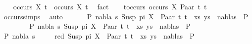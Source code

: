 \begin{isabellebody}
\ \ \isamarkupfalse%
\ {\isachardoublequoteopen}occurs\ X\ t{}\ {\isasymor}\ occurs\ X\ t{}{\isachardoublequoteclose}\ \isamarkupfalse%
\ fact\isanewline
\ \ \isamarkupfalse%
\ t{\isacharunderscore}{\kern0pt}occurs{\isacharcolon}{\kern0pt}\ {\isachardoublequoteopen}occurs\ X\ {\isacharparenleft}{\kern0pt}Paar\ t{}\ t{}{\isacharparenright}{\kern0pt}{\isachardoublequoteclose}\isanewline
\ \ \ \ \isamarkupfalse%
\ occurs{\isachardot}{\kern0pt}simps{\isacharparenleft}{\kern0pt}{}{\isacharparenright}{\kern0pt}\ \isamarkupfalse%
\ auto\isanewline
\ \ \isamarkupfalse%
\ \isamarkupfalse%
\ {\isachardoublequoteopen}{\isasymnot}\ {\isacharparenleft}{\kern0pt}{\isasymexists}P{}\ nabla\ s{\isachardot}{\kern0pt}\ {\isacharparenleft}{\kern0pt}{\isacharparenleft}{\kern0pt}Susp\ pi\ X\ {\isasymapprox}{\isacharquery}{\kern0pt}\ Paar\ t{}\ t{}{\isacharparenright}{\kern0pt}\ {\isacharhash}{\kern0pt}\ xs{\isacharcomma}{\kern0pt}\ ys{\isacharparenright}{\kern0pt}\ {\isasymTurnstile}\ {\isacharparenleft}{\kern0pt}nabla{\isacharcomma}{\kern0pt}s{\isacharparenright}{\kern0pt}\ {\isasymRightarrow}\ P{}{\isacharparenright}{\kern0pt}{\isachardoublequoteclose}\isanewline
\ \ \isamarkupfalse%
\isanewline
\ \ \ \ \isamarkupfalse%
\ {\isachardoublequoteopen}{\isasymexists}P{}\ nabla\ s{\isachardot}{\kern0pt}\ {\isacharparenleft}{\kern0pt}{\isacharparenleft}{\kern0pt}Susp\ pi\ X\ {\isasymapprox}{\isacharquery}{\kern0pt}\ Paar\ t{}\ t{}{\isacharparenright}{\kern0pt}\ {\isacharhash}{\kern0pt}\ xs{\isacharcomma}{\kern0pt}\ ys{\isacharparenright}{\kern0pt}\ {\isasymTurnstile}\ {\isacharparenleft}{\kern0pt}nabla{\isacharcomma}{\kern0pt}s{\isacharparenright}{\kern0pt}\ {\isasymRightarrow}\ P{}{\isachardoublequoteclose}\isanewline
\ \ \ \ \isamarkupfalse%
\ \isamarkupfalse%
\ P{}\ nabla\ s\ \isanewline
\ \ \ \ red{\isacharcolon}{\kern0pt}\ {\isachardoublequoteopen}{\isacharparenleft}{\kern0pt}{\isacharparenleft}{\kern0pt}Susp\ pi\ X\ {\isasymapprox}{\isacharquery}{\kern0pt}\ Paar\ t{}\ t{}{\isacharparenright}{\kern0pt}\ {\isacharhash}{\kern0pt}\ xs{\isacharcomma}{\kern0pt}\ ys{\isacharparenright}{\kern0pt}\ {\isasymTurnstile}\ {\isacharparenleft}{\kern0pt}nabla{\isacharcomma}{\kern0pt}s{\isacharparenright}{\kern0pt}\ {\isasymRightarrow}\ P{}{\isachardoublequoteclose}\isanewline

\end{isabellebody}
